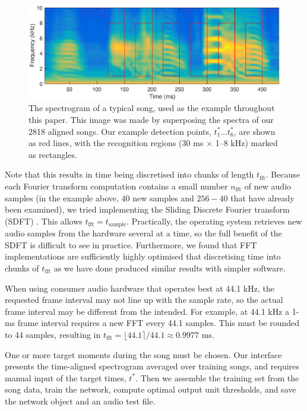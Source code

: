 \documentclass[10pt,letterpaper]{article}
\begin{document}
\begin{figure}
  \includegraphics[width=\textwidth]{Fig1}
  \caption{The spectrogram of a typical song, used as the example
    throughout this paper.  This image was made by superposing the
    spectra of our 2818 aligned songs.  Our example detection points,
    $t^*_1\ldots t^*_6$, are shown as red lines, with the recognition
    regions (30 ms $\times$ 1--8 kHz) marked as rectangles.}
  \label{fig:song}
\end{figure}



Note that this results in time being discretised into chunks of length
$t_\mathrm{fft}$.  Because each Fourier transform computation contains
a small number $n_\mathrm{fft}$ of new audio samples (in the example
above, 40 new samples and $256-40$ that have already been examined),
we tried implementing the Sliding Discrete Fourier transform (SDFT)
\cite{Jacobsen2003SlidingDFT}.  This allows
$t_\textrm{fft}=t_\textrm{sample}$.  Practically, the operating system
retrieves new audio samples from the hardware several at a time, so
the full benefit of the SDFT is difficult to see in practice.
Furthermore, we found that FFT implementations are sufficiently highly
optimised that discretising time into chunks of $t_\mathrm{fft}$ as we
have done produced similar results with simpler software.

When using consumer audio hardware that operates best at 44.1 kHz, the
requested frame interval may not line up with the sample rate, so the
actual frame interval may be different from the intended.  For
example, at 44.1 kHz a 1-ms frame interval requires a new FFT every
44.1 samples.  This must be rounded to 44 samples, resulting in
$t_\textrm{fft}=\lfloor 44.1 \rceil / 44.1 \approx 0.9977$ ms.

One or more target moments during the song must be chosen.  Our
interface presents the time-aligned spectrogram averaged over training
songs, and requires manual input of the target times, $t^*$.  Then we
assemble the training set from the song data, train the network,
compute optimal output unit thresholds, and save the network object
and an audio test file.
\end{document}
